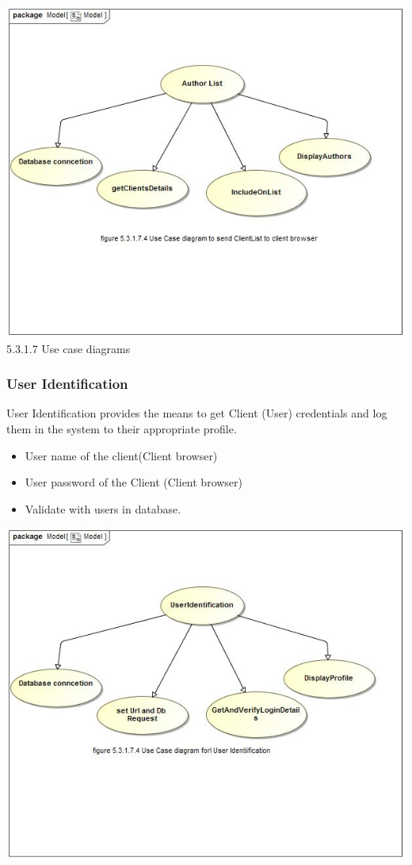 \documentclass[hidelinks,a4paper,12pt]{article}
\begin{document}
	\includegraphics[width=1\textwidth]{./Graphs/UseCaseforAuthorList.JPG}\\[0.4cm]
	
	5.3.1.7 Use case diagrams
	 
	
		\subsubsection{User Identification}
	
	User Identification provides the means to get Client (User) credentials and log them in the system to their appropriate profile. 
	
	\begin{itemize}
		\item User name of the client(Client browser)
		\item User password of the Client (Client browser)
		\item Validate with users in database. 
	\end{itemize}
	
	
	\includegraphics[width=1\textwidth]{./Graphs/UseCaseforUserIdentification.JPG}\\[0.4cm]
	
\end{document}
